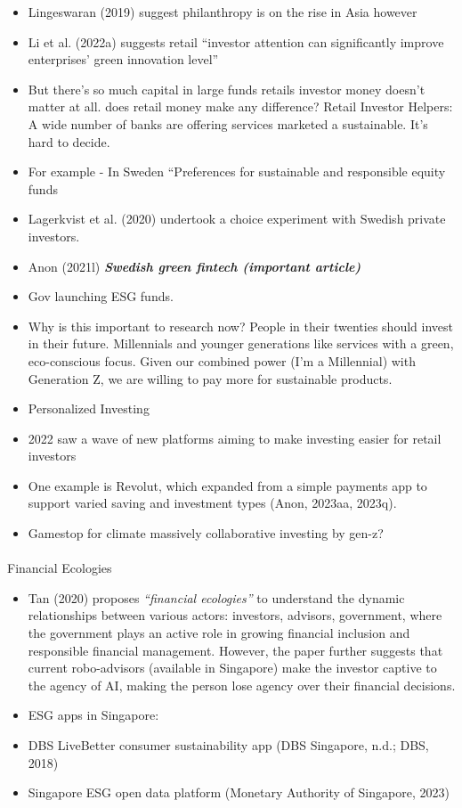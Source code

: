 \documentclass[
  letterpaper,
  DIV=11,
  numbers=noendperiod]{scrartcl}
\makeatletter
\let\oldparagraph\paragraph
\renewcommand{\paragraph}{
    \@ifstar
      \xxxParagraphStar
      \xxxParagraphNoStar
  }
\newcommand{\xxxParagraphStar}[1]{\oldparagraph*{#1}\mbox{}}
\newcommand{\xxxParagraphNoStar}[1]{\oldparagraph{#1}\mbox{}}
\makeatother
\begin{document}
\begin{itemize}
\item
  Lingeswaran (2019) suggest philanthropy is on the rise in Asia however
\item
  Li et al. (2022a) suggests retail ``investor attention can
  significantly improve enterprises' green innovation level''
\item
  But there's so much capital in large funds retails investor money
  doesn't matter at all. does retail money make any difference? Retail
  Investor Helpers: A wide number of banks are offering services
  marketed a sustainable. It's hard to decide.
\item
  For example - In Sweden ``Preferences for sustainable and responsible
  equity funds
\item
  Lagerkvist et al. (2020) undertook a choice experiment with Swedish
  private investors.
\item
  Anon (2021l) \textbf{\emph{Swedish green fintech (important article)}}
\item
  Gov launching ESG funds.
\item
  Why is this important to research now? People in their twenties should
  invest in their future. Millennials and younger generations like
  services with a green, eco-conscious focus. Given our combined power
  (I'm a Millennial) with Generation Z, we are willing to pay more for
  sustainable products.
\item
  Personalized Investing
\item
  2022 saw a wave of new platforms aiming to make investing easier for
  retail investors
\item
  One example is Revolut, which expanded from a simple payments app to
  support varied saving and investment types (Anon, 2023aa, 2023q).
\item
  Gamestop for climate massively collaborative investing by gen-z?
\end{itemize}

\paragraph{Financial Ecologies}\label{financial-ecologies}

\begin{itemize}
\item
  Tan (2020) proposes \emph{``financial ecologies''} to understand the
  dynamic relationships between various actors: investors, advisors,
  government, where the government plays an active role in growing
  financial inclusion and responsible financial management. However, the
  paper further suggests that current robo-advisors (available in
  Singapore) make the investor captive to the agency of AI, making the
  person lose agency over their financial decisions.
\item
  ESG apps in Singapore:
\item
  DBS LiveBetter consumer sustainability app (DBS Singapore, n.d.; DBS,
  2018)
\item
  Singapore ESG open data platform (Monetary Authority of Singapore,
  2023)
\end{itemize}
\end{document}
